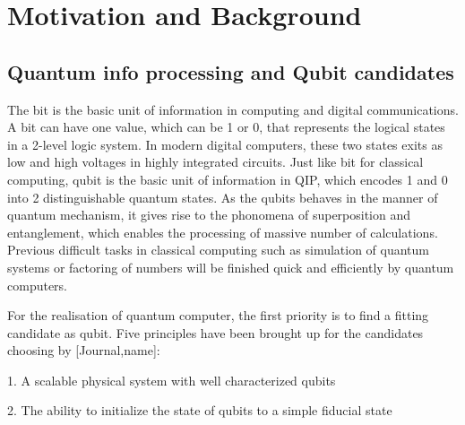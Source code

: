 
\chapter[Motivation and Background]
{Motivation and Background} %

\label{Chapter1} %







\newcommand{\keyword}[1]{\textbf{#1}}
\newcommand{\tabhead}[1]{\textbf{#1}}
\newcommand{\code}[1]{\texttt{#1}}
\newcommand{\file}[1]{\texttt{\bfseries#1}}
\newcommand{\option}[1]{\texttt{\itshape#1}}


\section[Quantum info processing and Qubit candidates]{Quantum info processing and Qubit candidates}

The bit is the basic unit of information in computing and digital communications. A bit can have one value, which can be 1 or 0, that represents the logical states in a 2-level logic system. In modern digital computers, these two states exits as low and high voltages in highly integrated circuits. Just like bit for classical computing, qubit is the basic unit of information in QIP, which encodes 1 and 0 into 2 distinguishable quantum states. As the qubits behaves in the manner of quantum mechanism, it gives rise to the phonomena of superposition and entanglement, which enables the processing of massive number of calculations. Previous difficult tasks in classical computing such as simulation of quantum systems or factoring of numbers will be finished quick and efficiently by quantum computers.

For the realisation of quantum computer,  the first priority is to find a fitting candidate as qubit. Five principles have been brought up for the candidates choosing by [Journal,name]:

1. A scalable physical system with well characterized qubits

2. The ability to initialize the state of qubits to a simple fiducial state

